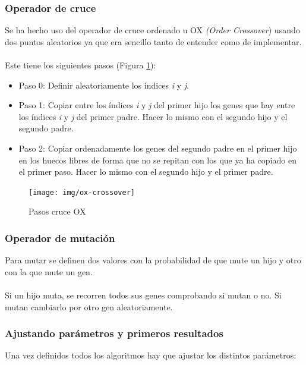 \label{sec:op-cruce}
\subsubsection{Operador de cruce}

Se ha hecho uso del operador de cruce ordenado u OX \textit{(Order Crossover}) usando dos puntos aleatorios ya que era sencillo tanto de entender como de implementar.
\\ \\
Este tiene los siguientes pasos (Figura \ref{fig:ox-crossover}):

\begin{itemize}
	\item Paso 0: Definir aleatoriamente los índices \textit{i} y \textit{j}.
	\item Paso 1: Copiar entre los índices \textit{i} y \textit{j} del primer hijo los genes que hay entre los índices \textit{i} y \textit{\textit{j}} del primer padre. Hacer lo mismo con el segundo hijo y el segundo padre.
	\item Paso 2: Copiar ordenadamente los genes del segundo padre en el primer hijo en los huecos libres de forma que no se repitan con los que ya ha copiado en el primer paso. Hacer lo mismo con el segundo hijo y el primer padre.
\end{itemize}

\begin{figure}[H]
	\centering
	\texttt{[image: img/ox-crossover]}
	\caption{Pasos cruce OX}
	\label{fig:ox-crossover}
\end{figure}

\subsubsection{Operador de mutación}

Para mutar se definen dos valores con la probabilidad de que mute un hijo y otro con la que mute un gen.
\\ \\
Si un hijo muta, se recorren todos sus genes comprobando si mutan o no. Si mutan cambiarlo por otro gen aleatoriamente.

\label{sec:standard-parameters}
\subsubsection{Ajustando parámetros y primeros resultados}

Una vez definidos todos los algoritmos hay que ajustar los distintos parámetros:

